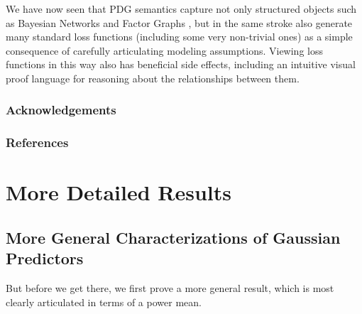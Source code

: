 \documentclass[twoside]{article}
\theoremstyle{plain}
\theoremstyle{definition}
\begin{document}

We have now seen that PDG semantics capture not only structured objects such as Bayesian Networks and Factor Graphs \cite{richardson2020probabilistic}, but in the same stroke also generate many standard loss functions (including some very non-trivial ones) as a simple consequence of carefully articulating modeling assumptions.
Viewing loss functions in this way also has beneficial side effects, including an intuitive visual proof language for reasoning about the relationships between them.


\subsubsection*{Acknowledgements}


\subsubsection*{References}






\clearpage
\onecolumn
\appendix

\section{More Detailed Results}
\subsection{More General Characterizations of Gaussian Predictors}
But before we get there, we first prove a more general result, which is most clearly articulated in terms of a power mean.
\end{document}
